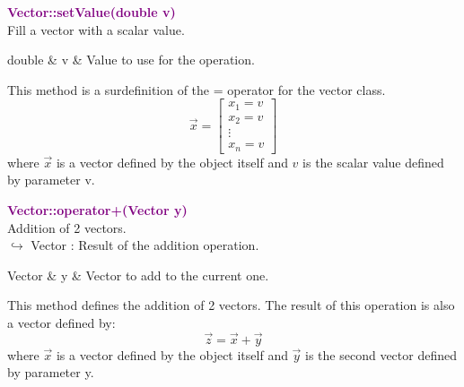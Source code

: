 \textcolor{purple}{\textbf{Vector::setValue(double v)}}\label{Vector::setValue(double v)}\\
Fill a vector with a scalar value.

\begin{tcolorbox}[width=\textwidth,myArgs,tabularx={ll|R}]
double & v & Value to use for the operation.
\end{tcolorbox}

This method is a surdefinition of the = operator for the vector class.
\begin{equation*}
\overrightarrow{x}=\left[\begin{array}{c}
  x_{1}=v\\
  x_{2}=v\\
  \vdots\\
  x_{n}=v
  \end{array}\right]
\end{equation*}
where $\overrightarrow{x}$ is a vector defined by the object itself and $v$ is the scalar value defined by parameter v.

\textcolor{purple}{\textbf{Vector::operator+(Vector y)}}\label{Vector::operator+(Vector y)}\\
Addition of 2 vectors.\\ \hspace*{10mm}$\hookrightarrow$ Vector : Result of the addition operation.

\begin{tcolorbox}[width=\textwidth,myArgs,tabularx={ll|R}]
Vector & y & Vector to add to the current one.
\end{tcolorbox}

This method defines the addition of 2 vectors.
The result of this operation is also a vector defined by:
\begin{equation*}
\overrightarrow{z}=\overrightarrow{x}+\overrightarrow{y}
\end{equation*}
where $\overrightarrow{x}$ is a vector defined by the object itself and $\overrightarrow{y}$ is the second vector defined by parameter y.

